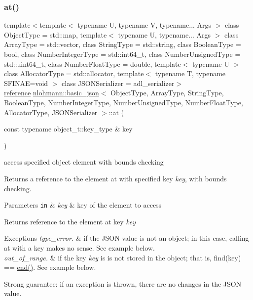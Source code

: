 \subsubsection{\texorpdfstring{at()}{at()}\hspace{0.1cm}{\footnotesize\ttfamily [3/6]}}
{\footnotesize\ttfamily template$<$template$<$ typename U, typename V, typename... Args $>$ class Object\+Type = std\+::map, template$<$ typename U, typename... Args $>$ class Array\+Type = std\+::vector, class String\+Type  = std\+::string, class Boolean\+Type  = bool, class Number\+Integer\+Type  = std\+::int64\+\_\+t, class Number\+Unsigned\+Type  = std\+::uint64\+\_\+t, class Number\+Float\+Type  = double, template$<$ typename U $>$ class Allocator\+Type = std\+::allocator, template$<$ typename T, typename S\+F\+I\+N\+A\+E=void $>$ class J\+S\+O\+N\+Serializer = adl\+\_\+serializer$>$ \\
\mbox{\hyperlink{classnlohmann_1_1basic__json_ac6a5eddd156c776ac75ff54cfe54a5bc}{reference}} \mbox{\hyperlink{classnlohmann_1_1basic__json}{nlohmann\+::basic\+\_\+json}}$<$ Object\+Type, Array\+Type, String\+Type, Boolean\+Type, Number\+Integer\+Type, Number\+Unsigned\+Type, Number\+Float\+Type, Allocator\+Type, J\+S\+O\+N\+Serializer $>$\+::at (\begin{DoxyParamCaption}\item[{const typename object\+\_\+t\+::key\+\_\+type \&}]{key }\end{DoxyParamCaption})\hspace{0.3cm}{\ttfamily [inline]}}



access specified object element with bounds checking 

Returns a reference to the element at with specified key {\itshape key}, with bounds checking.


\begin{DoxyParams}[1]{Parameters}
\mbox{\tt in}  & {\em key} & key of the element to access\\
\hline
\end{DoxyParams}
\begin{DoxyReturn}{Returns}
reference to the element at key {\itshape key} 
\end{DoxyReturn}

\begin{DoxyExceptions}{Exceptions}
{\em type\+\_\+error.} & if the J\+S\+ON value is not an object; in this case, calling {\ttfamily at} with a key makes no sense. See example below. \\
\hline
{\em out\+\_\+of\+\_\+range.} & if the key {\itshape key} is is not stored in the object; that is, {\ttfamily find(key) == \mbox{\hyperlink{classnlohmann_1_1basic__json_a13e032a02a7fd8a93fdddc2fcbc4763c}{end()}}}. See example below.\\
\hline
\end{DoxyExceptions}
Strong guarantee\+: if an exception is thrown, there are no changes in the J\+S\+ON value.

